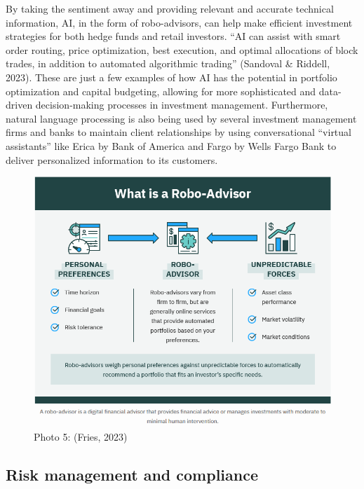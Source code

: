 \documentclass[
]{article}
\begin{document}
By taking the sentiment away and providing relevant and accurate technical information, AI, in the form of robo-advisors, can help make efficient investment strategies for both hedge funds and retail investors. ``AI can assist with smart order routing, price optimization, best execution, and optimal allocations of block trades, in addition to automated algorithmic trading'' (Sandoval \& Riddell, 2023). These are just a few examples of how AI has the potential in portfolio optimization and capital budgeting, allowing for more sophisticated and data-driven decision-making processes in investment management. Furthermore, natural language processing is also being used by several investment management firms and banks to maintain client relationships by using conversational ``virtual assistants'' like Erica by Bank of America and Fargo by Wells Fargo Bank to deliver personalized information to its customers.

\begin{figure}
\centering
\includegraphics{roboadvisors.png}
\caption{Photo 5: (Fries, 2023)}
\end{figure}

\hypertarget{risk-management-and-compliance}{%
\subsection{Risk management and compliance}\label{risk-management-and-compliance}}
\end{document}
